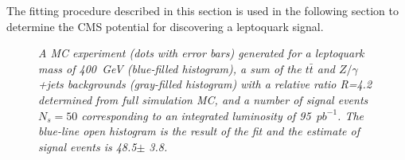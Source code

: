 The fitting procedure described in this section is used in the following section
to determine the CMS potential for discovering a leptoquark signal. 

 \begin{figure}[htb]
   \begin{center}
     \caption{\small \sl A MC experiment (dots with error bars) generated for a leptoquark mass of 
       400~GeV (blue-filled histogram), a sum of the $t\bar{t}$ and $Z/\gamma$+jets 
       backgrounds (gray-filled histogram) with a relative ratio R=4.2 determined from 
       full simulation MC, and a number of signal events $N_s=50$ corresponding
       to an integrated luminosity of 95~$pb^{-1}$.
       The blue-line open histogram is the result of the fit and the estimate of signal 
       events is 48.5$\pm$ 3.8.}
     \label{fig:Mej_fit}
   \end{center}
 \end{figure}





%

